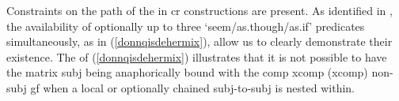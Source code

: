 \documentclass[output=paper]{LSP/langsci}
\begin{document}





Constraints on the path of the  in {\sc cr} constructions are present. As identified in \citet[179]{Camilleri16}, the availability of optionally up to three `seem/as.though/as.if' predicates simultaneously, as in (\ref{donnqisdehermix}), allow us to clearly demonstrate their existence.
The  of (\ref{donnqisdehermix}) illustrates that it is not possible to have the matrix {\sc subj} being anaphorically bound with the {\sc comp xcomp (xcomp)} non-{\sc subj} {\sc gf} when a local or optionally chained {\sc subj}-to-{\sc subj}  is nested within. %
\end{document}
